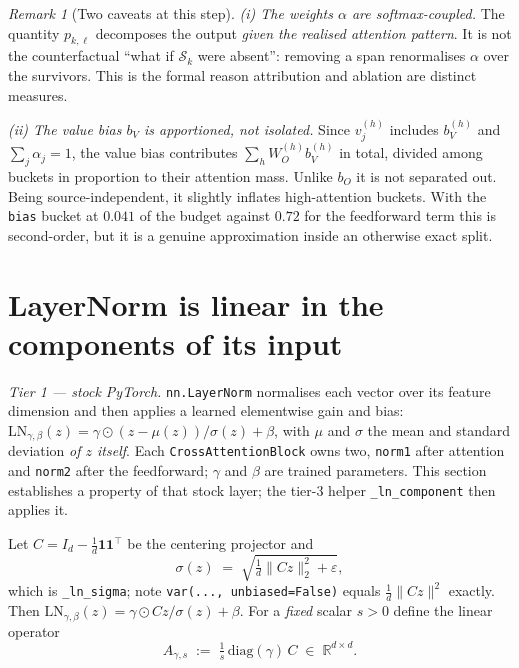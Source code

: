 \documentclass[11pt]{article}
\theoremstyle{plain}
\theoremstyle{remark}
\newtheorem*{remark}{Remark}
\newcommand{\R}{\mathbb{R}}
\newcommand{\Sset}{\mathcal{S}}
\newcommand{\LN}{\mathrm{LN}}
\newcommand{\norm}[1]{\lVert #1 \rVert}
\newcommand{\code}[1]{\texttt{\small #1}}
\begin{document}
\begin{remark}[Two caveats at this step]
\emph{(i) The weights $\alpha$ are softmax-coupled.} The quantity $p_{k,\ell}$
decomposes the output \emph{given the realised attention pattern}. It is not
the counterfactual ``what if $\Sset_k$ were absent'': removing a span
renormalises $\alpha$ over the survivors. This is the formal reason attribution
and ablation are distinct measures.

\emph{(ii) The value bias $b_V$ is apportioned, not isolated.} Since
$v^{(h)}_j$ includes $b_V^{(h)}$ and $\sum_j \alpha_j = 1$, the value bias
contributes $\sum_h W_O^{(h)} b_V^{(h)}$ in total, divided among buckets in
proportion to their attention mass. Unlike $b_O$ it is not separated out.
Being source-independent, it slightly inflates high-attention buckets. With the
\code{bias} bucket at $0.041$ of the budget against $0.72$ for the feedforward
term this is second-order, but it is a genuine approximation inside an
otherwise exact split.
\end{remark}

\section{LayerNorm is linear in the components of its input}
\label{sec:ln}

\emph{Tier 1 --- stock PyTorch.} \code{nn.LayerNorm} normalises each vector
over its feature dimension and then applies a learned elementwise gain and
bias: $\LN_{\gamma,\beta}(z) = \gamma \odot (z - \mu(z))/\sigma(z) + \beta$,
with $\mu$ and $\sigma$ the mean and standard deviation \emph{of $z$ itself}.
Each \code{CrossAttentionBlock} owns two, \code{norm1} after attention and
\code{norm2} after the feedforward; $\gamma$ and $\beta$ are trained
parameters. This section establishes a property of that stock layer; the
tier-3 helper \code{\_ln\_component} then applies it.

Let $C = I_d - \tfrac{1}{d}\mathbf{1}\mathbf{1}^{\!\top}$ be the centering
projector and
\[
  \sigma(z) \;=\; \sqrt{\tfrac{1}{d}\norm{Cz}_2^2 + \varepsilon},
\]
which is \code{\_ln\_sigma}; note \code{var(..., unbiased=False)} equals
$\tfrac1d\norm{Cz}^2$ exactly. Then
$\LN_{\gamma,\beta}(z) = \gamma \odot Cz/\sigma(z) + \beta$. For a
\emph{fixed} scalar $s > 0$ define the linear operator
\begin{equation}
  \boxed{\;A_{\gamma,s} \;:=\; \tfrac{1}{s}\,\mathrm{diag}(\gamma)\,C
  \;\in\; \R^{d\times d}.\;}
  \label{eq:lnop}
\end{equation}
\end{document}
